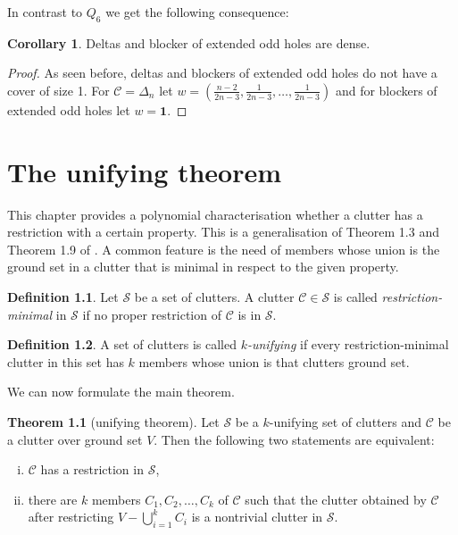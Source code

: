 \documentclass[a4paper, 12pt, twoside=false]{scrbook}
\theoremstyle{definition}
\newtheorem*{definition}{Definition}
\newtheorem{theorem}{Theorem}[chapter]
\newtheorem{corollary}[theorem]{Corollary}
\begin{document}
In contrast to $Q_6$ we get the following consequence:
\begin{corollary}
    Deltas and blocker of extended odd holes are dense.
\end{corollary}

\begin{proof}
    As seen before, deltas and blockers of extended odd holes do not have a cover of size 1.
    For $\mathcal{C}=\Delta_n$ let $w=\left(\frac{n-2}{2n-3}, \frac 1{2n-3}, \ldots, \frac 1{2n-3}\right)$ and for blockers of extended odd holes let $w=\textbf{1}$.
\end{proof}

\chapter{The unifying theorem}
This chapter provides a polynomial characterisation whether a clutter has a restriction with a certain property.
This is a generalisation of Theorem 1.3 and Theorem 1.9 of \cite{restrictions}.
A common feature is the need of members whose union is the ground set in a clutter that is minimal in respect to the given property.
   \begin{definition}
       Let $\mathcal{S}$ be a set of clutters.
       A clutter $\mathcal{C} \in \mathcal{S}$ is called \emph{restriction-minimal} in $\mathcal{S}$ if no proper restriction of $\mathcal{C}$ is in $\mathcal{S}$.
   \end{definition}

   \begin{definition}
       A set of clutters is called \emph{$k$-unifying} if every restriction-minimal clutter in this set has $k$ members whose union is that clutters ground set.
   \end{definition}

   We can now formulate the main theorem.

   \begin{theorem}[unifying theorem]\label{unifying}
       Let $\mathcal{S}$ be a $k$-unifying set of clutters and $\mathcal{C}$ be a clutter over ground set $V$.
       Then the following two statements are equivalent:
       \leavevmode
       \begin{enumerate}[(i)]
           \item $\mathcal{C}$ has a restriction in $\mathcal{S}$,
           \item there are $k$ members $C_1, C_2, \ldots, C_k$ of $\mathcal{C}$ such that the clutter obtained by $\mathcal{C}$ after restricting $V - \bigcup_{i=1}^k C_i$ is a nontrivial clutter in $\mathcal{S}$.
       \end{enumerate}
   \end{theorem}
\end{document}
